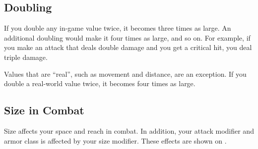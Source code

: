 \subsection{Doubling}\label{Doubling}
If you double any in-game value twice, it becomes three times as large. An additional doubling would make it four times as large, and so on. For example, if you make an attack that deals double damage and you get a critical hit, you deal triple damage.

 Values that are ``real'', such as movement and distance, are an exception. If you double a real-world value twice, it becomes four times as large. 

\subsection{Size in Combat}\label{Size in Combat}
Size affects your space and reach in combat. In addition, your attack modifier and armor class is affected by your size modifier. These effects are shown on . 

